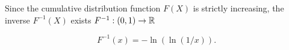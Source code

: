 
Since the cumulative distribution function $ F(X)$ is strictly increasing, the inverse $ F^{-1} (X)$
exists $ F^{-1}: (0,1) \to \mathbb{R} $

\[
    F^{-1}(x) = -\ln(\ln(1/x)) 
.\] 
